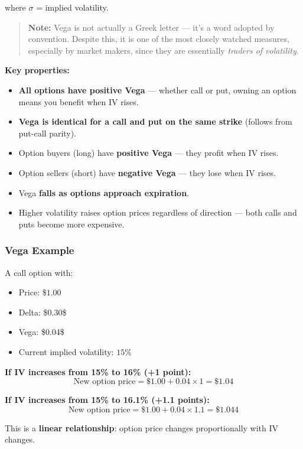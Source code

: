 \documentclass[12pt,openany]{book}
\begin{document}
where \(\sigma\) = implied volatility.

\begin{quote}
\textbf{Note:} Vega is not actually a Greek letter — it's a word adopted by convention. Despite this, it is one of the most closely watched measures, especially by market makers, since they are essentially \emph{traders of volatility}.
\end{quote}

\textbf{Key properties:}
\begin{itemize}[leftmargin=*]
    \item \textbf{All options have positive Vega} — whether call or put, owning an option means you benefit when IV rises.
    \item \textbf{Vega is identical for a call and put on the same strike} (follows from put-call parity).
    \item Option buyers (long) have \textbf{positive Vega} — they profit when IV rises.
    \item Option sellers (short) have \textbf{negative Vega} — they lose when IV rises.
    \item Vega \textbf{falls as options approach expiration}.
    \item Higher volatility raises option prices regardless of direction — both calls and puts become more expensive.
\end{itemize}

\subsubsection{Vega Example}

A call option with:
\begin{itemize}[leftmargin=*]
    \item Price: \(\$1.00\)
    \item Delta: \$0.30\$
    \item Vega: \$0.04\$
    \item Current implied volatility: \(15\%\)
\end{itemize}

\textbf{If IV increases from 15\% to 16\% (+1 point):}
\[
\text{New option price} = \$1.00 + 0.04 \times 1 = \$1.04
\]

\textbf{If IV increases from 15\% to 16.1\% (+1.1 points):}
\[
\text{New option price} = \$1.00 + 0.04 \times 1.1 = \$1.044
\]

This is a \textbf{linear relationship}: option price changes proportionally with IV changes.
\end{document}
